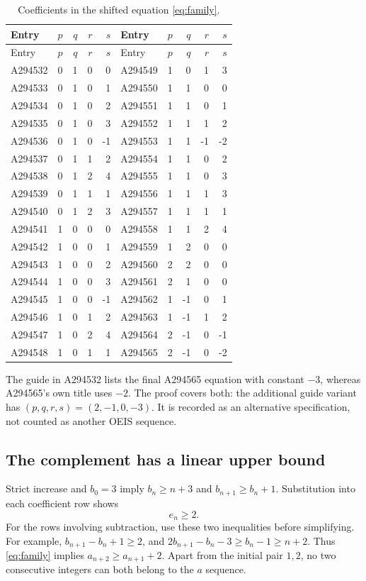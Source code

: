 \documentclass[11pt]{article}
\begin{document}
\begin{center}
\small
\begin{longtable}{lrrrr@{\qquad}lrrrr}
\caption{Coefficients in the shifted equation \eqref{eq:family}.}\label{tab:family}\\
\toprule
Entry&$p$&$q$&$r$&$s$&Entry&$p$&$q$&$r$&$s$\\
\midrule
\endfirsthead
\toprule
Entry&$p$&$q$&$r$&$s$&Entry&$p$&$q$&$r$&$s$\\
\midrule
\endhead
A294532&0&1&0&0&A294549&1&0&1&3\\
A294533&0&1&0&1&A294550&1&1&0&0\\
A294534&0&1&0&2&A294551&1&1&0&1\\
A294535&0&1&0&3&A294552&1&1&1&2\\
A294536&0&1&0&-1&A294553&1&1&-1&-2\\
A294537&0&1&1&2&A294554&1&1&0&2\\
A294538&0&1&2&4&A294555&1&1&0&3\\
A294539&0&1&1&1&A294556&1&1&1&3\\
A294540&0&1&2&3&A294557&1&1&1&1\\
A294541&1&0&0&0&A294558&1&1&2&4\\
A294542&1&0&0&1&A294559&1&2&0&0\\
A294543&1&0&0&2&A294560&2&2&0&0\\
A294544&1&0&0&3&A294561&2&1&0&0\\
A294545&1&0&0&-1&A294562&1&-1&0&1\\
A294546&1&0&1&2&A294563&1&-1&1&2\\
A294547&1&0&2&4&A294564&2&-1&0&-1\\
A294548&1&0&1&1&A294565&2&-1&0&-2\\
\bottomrule
\end{longtable}
\end{center}

The guide in A294532 lists the final A294565 equation with constant
$-3$, whereas A294565's own title uses $-2$. The proof covers both:
the additional guide variant has $(p,q,r,s)=(2,-1,0,-3)$.
It is recorded as an alternative specification, not counted as another
OEIS sequence.

\subsection{The complement has a linear upper bound}

Strict increase and $b_0=3$ imply $b_n\ge n+3$ and
$b_{n+1}\ge b_n+1$. Substitution into each coefficient row shows
\begin{equation}
 e_n\ge2.\label{eq:force-positive}
\end{equation}
For the rows involving subtraction, use these two inequalities before
simplifying. For example,
$b_{n+1}-b_n+1\ge2$, and
$2b_{n+1}-b_n-3\ge b_n-1\ge n+2$.
Thus \eqref{eq:family} implies $a_{n+2}\ge a_{n+1}+2$.
Apart from the initial pair $1,2$, no two consecutive integers can both
belong to the $a$ sequence.
\end{document}
